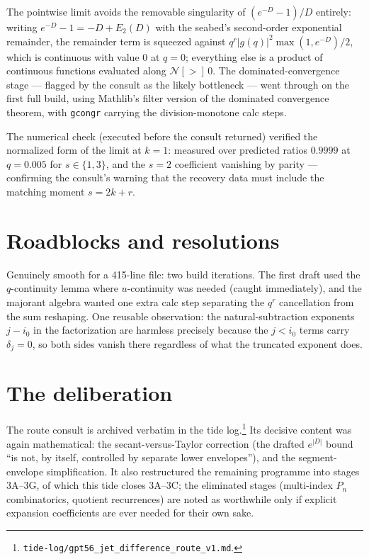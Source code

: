 \documentclass[11pt]{article}
\begin{document}
The pointwise limit avoids the removable singularity of
$(e^{-D}-1)/D$ entirely: writing $e^{-D} - 1 = -D + E_2(D)$ with the
seabed's second-order exponential remainder, the remainder term is
squeezed against $q^r |g(q)|^2 \max(1, e^{-D})/2$, which is
continuous with value $0$ at $q = 0$; everything else is a product of
continuous functions evaluated along $\mathcal{N}[>]\,0$. The
dominated-convergence stage --- flagged by the consult as the likely
bottleneck --- went through on the first full build, using Mathlib's
filter version of the dominated convergence theorem, with
\texttt{gcongr} carrying the division-monotone calc steps.

The numerical check (executed before the consult returned) verified
the normalized form of the limit at $k = 1$: measured over predicted
ratios $0.9999$ at $q = 0.005$ for $s \in \{1, 3\}$, and the $s = 2$
coefficient vanishing by parity --- confirming the consult's warning
that the recovery data must include the matching moment $s = 2k + r$.

\section{Roadblocks and resolutions}

Genuinely smooth for a 415-line file: two build iterations. The
first draft used the $q$-continuity lemma where $u$-continuity was
needed (caught immediately), and the majorant algebra wanted one
extra calc step separating the $q^r$ cancellation from the sum
reshaping. One reusable observation: the natural-subtraction
exponents $j - i_0$ in the factorization are harmless precisely
because the $j < i_0$ terms carry $\delta_j = 0$, so both sides
vanish there regardless of what the truncated exponent does.

\section{The deliberation}

The route consult is archived verbatim in the tide
log.\footnote{\texttt{tide-log/gpt56\_jet\_difference\_route\_v1.md}.}
Its decisive content was again mathematical: the secant-versus-Taylor
correction (the drafted $e^{|D|}$ bound ``is not, by itself,
controlled by separate lower envelopes''), and the segment-envelope
simplification. It also restructured the remaining programme into
stages 3A--3G, of which this tide closes 3A--3C; the eliminated
stages (multi-index $P_n$ combinatorics, quotient recurrences) are
noted as worthwhile only if explicit expansion coefficients are ever
needed for their own sake.
\end{document}
